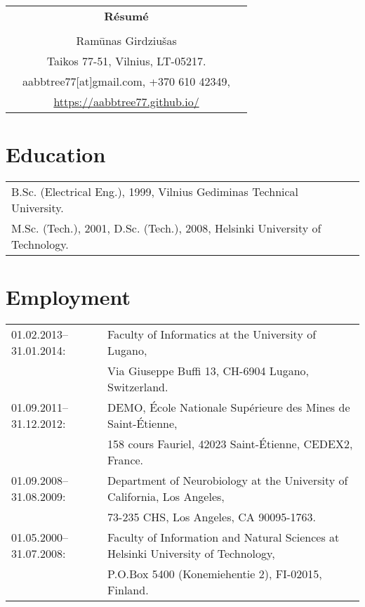 \documentclass[a4paper,11pt]{article}
\begin{document}
\thispagestyle{empty}

%
%
\begin{center}
\begin{tabular}{ccc}
&\Large \textbf{R\'{e}sum\'{e}}&\\
\\
& Ram\={u}nas Girdziu\v{s}as &\\  
& Taikos 77-51, Vilnius, LT-05217. &\\
& aabbtree77[at]gmail.com, +370 610 42349, &\\
& \url{https://aabbtree77.github.io/}
\end{tabular}
\end{center}
%
\section*{Education}
%
\begin{tabular}{ll}
        B.Sc. (Electrical Eng.), 1999, Vilnius Gediminas Technical University.\\
        M.Sc. (Tech.), 2001, D.Sc. (Tech.), 2008, Helsinki University of Technology.
\end{tabular}
%
\section*{Employment}
%
\begin{tabular}{ll}
01.02.2013--31.01.2014: & Faculty of Informatics at the University of Lugano,\\
                        & Via Giuseppe Buffi 13, CH-6904 Lugano, Switzerland. 
\\
01.09.2011--31.12.2012: & DEMO, \'{E}cole Nationale Sup\'{e}rieure des Mines de Saint-\'{E}tienne,\\
&158 cours Fauriel, 42023 Saint-\'Etienne, CEDEX2, France.
\\
01.09.2008--31.08.2009: & Department of Neurobiology at the University of California, Los Angeles,\\
&73-235 CHS, Los Angeles, CA 90095-1763.
\\
01.05.2000--31.07.2008: & Faculty of Information and Natural Sciences at Helsinki University of Technology,\\ 
&  P.O.Box 5400 (Konemiehentie 2), FI-02015, Finland.
\end{tabular}
\end{document}
